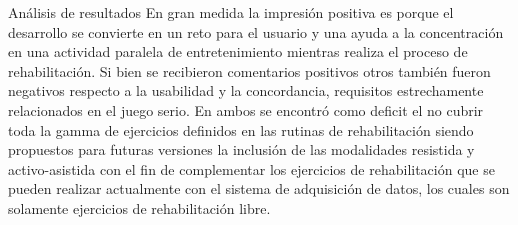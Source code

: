 \begin{thesischapter}{3} {Análisis de resultados}
    \vspace{10pt}
    En gran medida la impresión positiva es porque el desarrollo se convierte en un
    reto para el usuario y una ayuda a la concentración en una actividad paralela de entretenimiento mientras realiza el proceso de
    rehabilitación. Si bien se recibieron comentarios  positivos otros también fueron negativos
    respecto a la usabilidad y la concordancia, requisitos estrechamente relacionados en el juego serio. En ambos se 
    encontró como deficit el no cubrir toda la gamma de ejercicios definidos en las rutinas de rehabilitación siendo 
    propuestos para futuras versiones la inclusión de las modalidades resistida y activo-asistida con el fin de complementar
    los ejercicios de rehabilitación que se pueden realizar actualmente con el sistema de adquisición de datos, 
    los cuales son solamente ejercicios de rehabilitación libre.
    
\end{thesischapter}